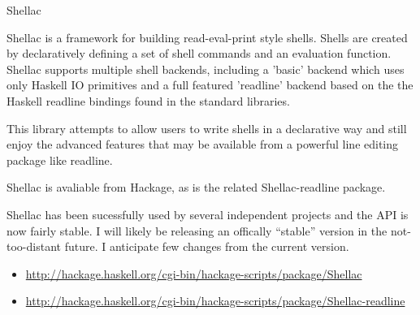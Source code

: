 \documentclass{article}
\begin{document}
\begin{hcarentry}{Shellac}
\makeheader

Shellac is a framework for building read-eval-print style shells.  
Shells are created by declaratively defining a set of shell commands
and an evaluation function.  Shellac supports multiple shell backends,
including a 'basic' backend which uses only Haskell IO primitives and
a full featured 'readline' backend based on the the Haskell readline
bindings found in the standard libraries.

This library attempts to allow users to write shells in a declarative
way and still enjoy the advanced features that may be available from a
powerful line editing package like readline. 

Shellac is avaliable from Hackage, as is the related
Shellac-readline package.

Shellac has been sucessfully used by several independent projects
and the API is now fairly stable.  I will likely be releasing an
offically ``stable'' version in the not-too-distant future.
I anticipate few changes from the current version.

\FurtherReading
\begin{itemize}
\item \url{http://hackage.haskell.org/cgi-bin/hackage-scripts/package/Shellac}
\item \url{http://hackage.haskell.org/cgi-bin/hackage-scripts/package/Shellac-readline}
\end{itemize}
\end{hcarentry}
\end{document}

